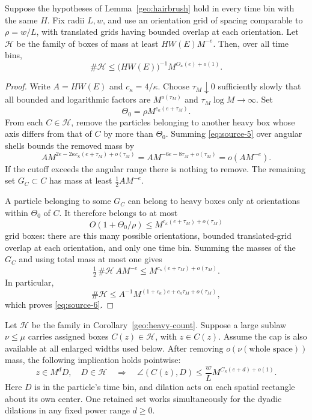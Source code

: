 \begin{corollary}\label{geo:heavy-count}
Suppose the hypotheses of Lemma~\ref{geo:hairbrush} hold in every
time bin with the same \(H\).  Fix radii \(L,w\), and use an
orientation grid of spacing comparable to \(\rho=w/L\), with
translated grids having bounded overlap at each orientation.
Let \(\mathcal H\) be the family of boxes of mass at least
\(HW(E)M^{-e}\).  Then, over all time bins,
\begin{equation}\label{eq:source-6}
\#\mathcal H
\le \bigl(HW(E)\bigr)^{-1}M^{O_\kappa(e)+o(1)}.
\end{equation}
\end{corollary}

\begin{proof}
Write \(A=HW(E)\) and \(c_\kappa=4/\kappa\).  Choose
\(\tau_M\downarrow0\) sufficiently slowly that all bounded and
logarithmic factors are \(M^{o(\tau_M)}\) and
\(\tau_M\log M\to\infty\).  Set
\[
\Theta_0=\rho M^{c_\kappa(e+\tau_M)}.
\]
From each \(C\in\mathcal H\), remove the particles belonging to
another heavy box whose axis differs from that of \(C\) by more
than \(\Theta_0\).  Summing \eqref{eq:source-5} over angular shells
bounds the removed mass by
\[
A M^{2e-2\kappa c_\kappa(e+\tau_M)+o(\tau_M)}
=A M^{-6e-8\tau_M+o(\tau_M)}
=o(AM^{-e}).
\]
If the cutoff exceeds the angular range there is nothing to
remove.  The remaining set \(G_C\subset C\) has mass at least
\(\tfrac12 AM^{-e}\).

A particle belonging to some \(G_C\) can belong to heavy boxes
only at orientations within \(\Theta_0\) of \(C\).  It therefore
belongs to at most
\[
O(1+\Theta_0/\rho)
\le M^{c_\kappa(e+\tau_M)+o(\tau_M)}
\]
grid boxes: there are this many possible orientations, bounded
translated-grid overlap at each orientation, and only one time
bin.  Summing the masses of the \(G_C\) and using total mass at
most one gives
\[
\tfrac12\,\#\mathcal H\,AM^{-e}
\le M^{c_\kappa(e+\tau_M)+o(\tau_M)}.
\]
In particular,
\[
\#\mathcal H
\le A^{-1}M^{(1+c_\kappa)e+c_\kappa\tau_M+o(\tau_M)},
\]
which proves \eqref{eq:source-6}.
\end{proof}

\begin{corollary}\label{geo:angular-exclusion}
Let \(\mathcal H\) be the family in
Corollary~\ref{geo:heavy-count}.  Suppose a large sublaw
\(\nu\le\mu\) carries assigned boxes \(C(z)\in\mathcal H\), with
\(z\in C(z)\).  Assume the cap is also available at all enlarged
widths used below.  After removing \(o(\nu(\text{whole space}))\)
mass, the following implication holds pointwise:
\[
z\in M^d D,\quad D\in\mathcal H
\quad\Longrightarrow\quad
\angle(C(z),D)
\le\frac{w}{L}M^{C_\kappa(e+d)+o(1)}.
\]
Here \(D\) is in the particle's time bin, and dilation acts on
each spatial rectangle about its own center.  One retained set
works simultaneously for the dyadic dilations in any fixed
power range \(d\ge0\).
\end{corollary}

